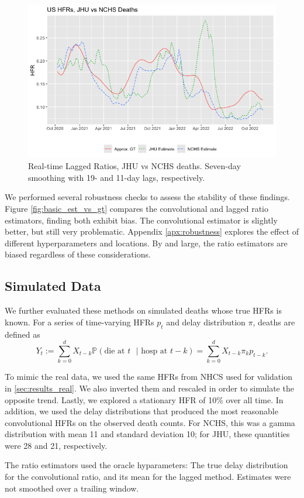 \documentclass{article}
\begin{document}
\begin{figure}
    \centering
    \includegraphics[width=0.7\linewidth]{Figs/jhu_vs_nchs.png}
    \caption{Real-time Lagged Ratios, JHU vs NCHS deaths. Seven-day smoothing with 19- and 11-day lags, respectively.}
    \label{fig:jhu_vs_nchs}
\end{figure}

We performed several robustness checks to assess the stability of these findings. Figure \ref{fig:basic_est_vs_gt} compares the convolutional and lagged ratio estimators, finding both exhibit bias. The convolutional estimator is slightly better, but still very problematic. Appendix \ref{apx:robustness} explores the effect of different hyperparameters and locations. By and large, the ratio estimators are biased regardless of these considerations. 

\subsection{Simulated Data}

We further evaluated these methods on simulated deaths whose true HFRs is known. For a series of time-varying HFRs $p_t$ and delay distribution $\pi$, deaths are defined as
$$Y_t := \sum_{k=0}^d X_{t-k} \mathbb{P}(\text{die at $t$ }\vert\text{ hosp at }t-k) = \sum_{k=0}^d X_{t-k} \pi_k p_{t-k}.$$

To mimic the real data, we used the same HFRs from NHCS used for validation in \ref{sec:results_real}. We also inverted them and rescaled in order to simulate the opposite trend. Lastly, we explored a stationary HFR of 10\% over all time. In addition, we used the delay distributions that produced the most reasonable convolutional HFRs on the observed death counts. For NCHS, this was a gamma distribution with mean 11 and standard deviation 10; for JHU, these quantities were 28 and 21, respectively. 

The ratio estimators used the oracle hyparameters: The true delay distribution for the convolutional ratio, and its mean for the lagged method. Estimates were not smoothed over a trailing window.
\end{document}
